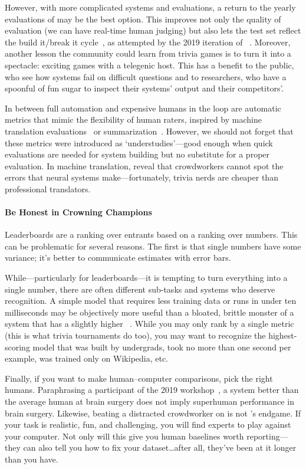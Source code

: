 However, with more complicated systems and evaluations, a return to the yearly evaluations of  may be the best option.
This improves not only the quality of evaluation (we can have real-time human judging) but also lets the test set reflect the build it/break it cycle~\cite{ruef-16}, as attempted by the 2019 iteration of ~\cite{thorne-19}.
Moreover, another lesson the  community could learn from
trivia games is to turn it into a spectacle: exciting games with a
telegenic host.
This has a benefit to the public, who see how  systems fail on difficult questions and to  researchers, who have a spoonful of fun sugar to inspect their systems' output and their competitors'.

In between full automation and expensive humans in the loop are automatic metrics that mimic the flexibility of human raters, inspired by machine translation evaluations~\cite{papineni-02,specia-10} or summarization~\cite{lin-04}.
However, we should not forget
that these metrics were introduced as `understudies'---good enough when quick evaluations are needed for system
building but no substitute for a proper evaluation.
In machine translation,  reveal that crowdworkers cannot spot the errors that neural  systems make---fortunately, trivia nerds are cheaper than professional translators.

\paragraph{Be Honest in Crowning  Champions}

Leaderboards are a ranking over entrants based on a ranking over numbers.
This can be problematic for several reasons.
The first is that single numbers have some variance; it's better to communicate estimates with error bars.

While---particularly for leaderboards---it is tempting to turn everything into a single number, there are often different sub-tasks and systems who deserve recognition.
A simple model that requires less training data or runs in under ten milliseconds may be objectively more useful than a bloated, brittle monster of a system that has a slightly higher \fone{}~\cite{dodge-19}.
While you may only rank by a single metric (this is what trivia tournaments do too), you may want to recognize the highest-scoring model that was built by undergrads, took no more than one second per example, was trained only on Wikipedia, etc.

Finally, if you want to make human--computer comparisons, pick the right humans.  Paraphrasing
a participant of the 2019  workshop~\cite{fisch-19}, a system better than the average human at brain surgery does not imply superhuman performance in brain surgery.
Likewise, beating a distracted crowdworker on  is not 's endgame.
If your task is realistic, fun, and challenging, you will find experts to play against your computer.
Not only will this give you human baselines worth reporting---they can also tell you how to fix your  dataset\dots after all, they've been at it longer than you have.
